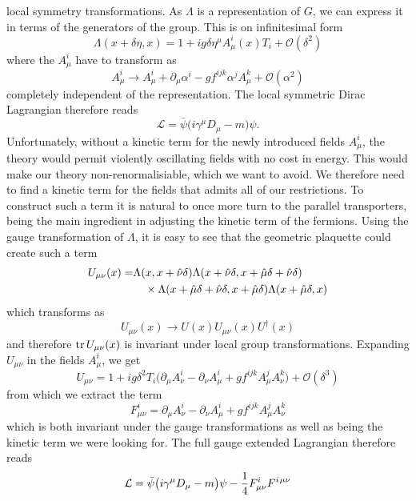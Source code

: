 local symmetry transformations. As $\Lambda$ is a representation of $G$, we can
express it in terms of the generators of the group. This is on infinitesimal
form
%
\begin{equation}
  \Lambda(x + \delta\eta,x) = 1 + i g \delta \eta^{\mu} A^i_{\mu}(x) T_i +
    \mathcal{O}(\delta^2)
\end{equation}
%
where the $A^i_{\mu}$ have to transform as
%
\begin{equation}
  A^i_{\mu} \to A^i_{\mu} + \partial_{\mu} \alpha^i - g f^{ijk} \alpha^j A^k_{\mu}
    + \mathcal{O}(\alpha^2)
\end{equation}
%
completely independent of the representation. The local symmetric Dirac
Lagrangian therefore reads
%
\begin{equation}
  \mathcal{L} = \bar{\psi}\big(i \gamma^{\mu} D_{\mu} - m\big) \psi.
\end{equation}
%
Unfortunately, without a kinetic term for the newly introduced fields
$A^i_{\mu}$, the theory would permit violently oscillating fields with no cost
in energy. This would make our theory non-renormalisiable, which we want to
avoid.  We therefore need to find a kinetic term for the fields that admits all
of our restrictions. To construct such a term it is natural to once more turn to
the parallel transporters, being the main ingredient in adjusting the kinetic
term of the fermions. Using the gauge transformation of $\Lambda$, it is easy to
see that the geometric plaquette could create such a term
%
\begin{align} \label{eq-transport_plaquette}
  U_{\mu\nu}(x) =& \Lambda(x, x + \hat{\nu} \delta)
    \Lambda(x + \hat{\nu} \delta, x + \hat{\mu} \delta + \hat{\nu} \delta) \nonumber\\
    &\hskip1em\times\Lambda(x + \hat{\mu} \delta + \hat{\nu}\delta, x + \hat{\mu} \delta)
    \Lambda(x + \hat{\mu}\delta, x)
\end{align}
%
which transforms as
%
\begin{equation}
  U_{\mu\nu}(x) \to U(x) U_{\mu\nu}(x) U^{\dagger}(x)
\end{equation}
%
and therefore $\operatorname{tr} U_{\mu\nu}(x)$ is invariant under local group
transformations. Expanding $U_{\mu\nu}$ in the fields $A^i_{\mu}$, we get
%
\begin{equation}
  U_{\mu\nu} = 1 + i g \delta^2 T_i \big( \partial_{\mu} A^i_{\nu} - \partial_{\nu}
  A^i_{\mu} + g f^{ijk} A^j_{\mu} A^k_{\nu} \big) + \mathcal{O}(\delta^3)
\end{equation}
%
from which we extract the term
%
\begin{equation} \label{eq-field_strength}
  F_{\mu\nu}^i = \partial_{\mu} A^i_{\nu} - \partial_{\nu}
    A^i_{\mu} + g f^{ijk} A^j_{\mu} A^k_{\nu}
\end{equation}
%
which is both invariant under the gauge transformations as well as being the
kinetic term we were looking for. The full gauge extended Lagrangian therefore
reads
%
\begin{equation} \label{eq-gauge_lagrangian}
  \mathcal{L} = \bar{\psi}\big(i \gamma^{\mu} D_{\mu} - m\big)\psi 
    - \frac{1}{4} F^i_{\mu\nu} F^{i\hskip.2ex\mu\nu}
\end{equation}

